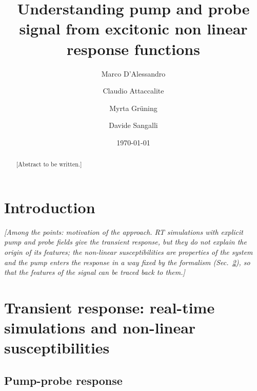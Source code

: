\documentclass[aps,prb,reprint,superscriptaddress,amsmath,amssymb]{revtex4-2}
\begin{document}
\title{Understanding pump and probe signal from excitonic non linear response functions}

\author{Marco D'Alessandro}
\affiliation{[affiliation]}
\author{Claudio Attaccalite}
\affiliation{[affiliation]}
\author{Myrta Gr\"uning}
\affiliation{[affiliation]}
\author{Davide Sangalli}
\affiliation{[affiliation]}

\date{\today}

\begin{abstract}
[Abstract to be written.]
\end{abstract}

\maketitle

\section{Introduction}
\label{sec:intro}

\textit{[Among the points: motivation of the approach. RT simulations with explicit pump
and probe fields give the transient response, but they do not explain the origin of its features; the
non-linear susceptibilities are properties of the system and the pump enters the response in a way fixed by the
formalism (Sec.~\ref{sec:theory}), so that the features of the signal can be traced back to them.]}

\section{Transient response: real-time simulations and non-linear susceptibilities}
\label{sec:theory}


\subsection{Pump-probe response}
\label{sec:theory_neq}
\end{document}
